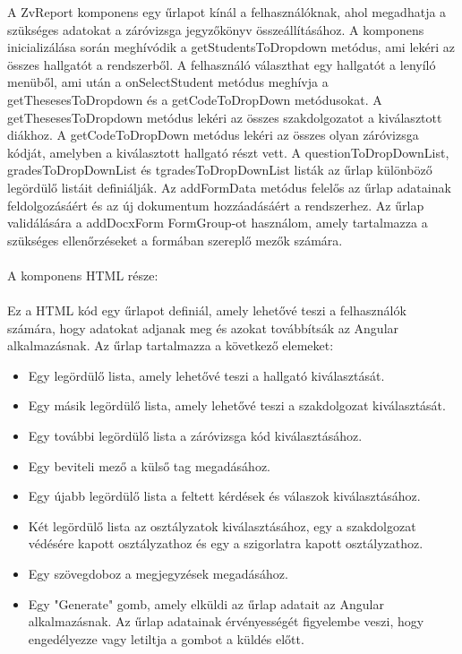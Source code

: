 A ZvReport komponens egy űrlapot kínál a felhasználóknak, ahol megadhatja a szükséges adatokat a záróvizsga jegyzőkönyv összeállításához. A komponens inicializálása során meghívódik a getStudentsToDropdown metódus, ami lekéri az összes hallgatót a rendszerből. A felhasználó választhat egy hallgatót a lenyíló menüből, ami után a onSelectStudent metódus meghívja a getThesesesToDropdown és a getCodeToDropDown metódusokat. A getThesesesToDropdown metódus lekéri az összes szakdolgozatot a kiválasztott diákhoz. A getCodeToDropDown metódus lekéri az összes olyan záróvizsga kódját, amelyben a kiválasztott hallgató részt vett. A questionToDropDownList, gradesToDropDownList és tgradesToDropDownList listák az űrlap különböző legördülő listáit definiálják. Az addFormData metódus felelős az űrlap adatainak feldolgozásáért és az új dokumentum hozzáadásáért a rendszerhez. Az űrlap validálására a addDocxForm FormGroup-ot használom, amely tartalmazza a szükséges ellenőrzéseket a formában szereplő mezők számára.\\
\\A komponens HTML része:\\
\\
Ez a HTML kód egy űrlapot definiál, amely lehetővé teszi a felhasználók számára, hogy adatokat adjanak meg és azokat továbbítsák az Angular alkalmazásnak. Az űrlap tartalmazza a következő elemeket:

\begin{itemize}

\item{}Egy legördülő lista, amely lehetővé teszi a hallgató kiválasztását.
\item{}Egy másik legördülő lista, amely lehetővé teszi a szakdolgozat kiválasztását.
\item{}Egy további legördülő lista a záróvizsga kód kiválasztásához.
\item{}Egy beviteli mező a külső tag megadásához.
\item{}Egy újabb legördülő lista a feltett kérdések és válaszok kiválasztásához.
\item{}Két legördülő lista az osztályzatok kiválasztásához, egy a szakdolgozat védésére kapott osztályzathoz és egy a szigorlatra kapott osztályzathoz.
\item{}Egy szövegdoboz a megjegyzések megadásához.
\item{}Egy "Generate" gomb, amely elküldi az űrlap adatait az Angular alkalmazásnak. Az űrlap adatainak érvényességét figyelembe veszi, hogy engedélyezze vagy letiltja a gombot a küldés előtt.

\end{itemize}